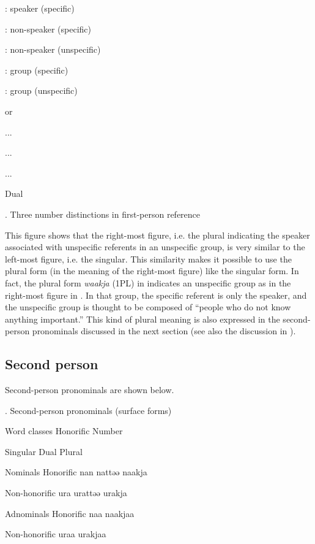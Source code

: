 : speaker (specific)

: non-speaker (specific)

: non-speaker (unspecific)

: group (specific)

: group (unspecific)

or

...

...

...

Dual

\begin{styleBeschriftung}
\textmd{. Three number distinctions in first-person reference}
\end{styleBeschriftung}

This figure shows that the right-most figure, i.e. the plural indicating the speaker associated with unspecific referents in an unspecific group, is very similar to the left-most figure, i.e. the singular. This similarity makes it possible to use the plural form (in the meaning of the right-most figure) like the singular form. In fact, the plural form \textit{waakja} (1PL) in  indicates an unspecific group as in the right-most figure in . In that group, the specific referent is only the speaker, and the unspecific group is thought to be composed of “people who do not know anything important.” This kind of plural meaning is also expressed in the second-person pronominals discussed in the next section (see also the discussion in ).

\subsection{Second person}

Second-person pronominals are shown below.

\begin{styleBeschriftung}
\textmd{. Second-person pronominals (surface forms)}
\end{styleBeschriftung}

Word classes  Honorific  Number

    Singular  Dual  Plural

Nominals  Honorific  nan  nattəə  naakja

  Non-honorific  ura  urattəə  urakja

Adnominals  Honorific  naa  naakjaa

  Non-honorific  uraa  urakjaa

